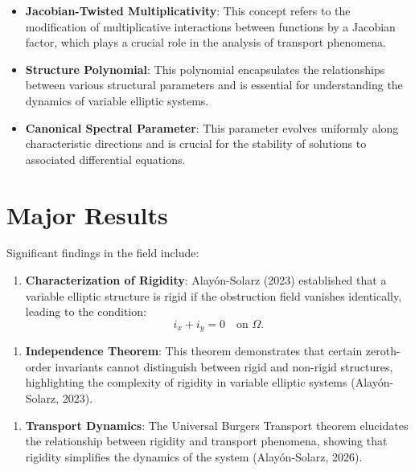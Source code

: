 \documentclass[11pt,a4paper]{article}
\begin{document}
\begin{itemize}
\item \textbf{Jacobian-Twisted Multiplicativity}: This concept refers to the modification of multiplicative interactions between functions by a Jacobian factor, which plays a crucial role in the analysis of transport phenomena.
\end{itemize}

\begin{itemize}
\item \textbf{Structure Polynomial}: This polynomial encapsulates the relationships between various structural parameters and is essential for understanding the dynamics of variable elliptic systems.
\end{itemize}

\begin{itemize}
\item \textbf{Canonical Spectral Parameter}: This parameter evolves uniformly along characteristic directions and is crucial for the stability of solutions to associated differential equations.
\end{itemize}

\section{Major Results}

Significant findings in the field include:

\begin{enumerate}
\item \textbf{Characterization of Rigidity}: Alayón-Solarz (2023) established that a variable elliptic structure is rigid if the obstruction field vanishes identically, leading to the condition:
\[
i_x + i_y = 0 \quad \text{on } \Omega.
\]
\end{enumerate}

\begin{enumerate}
\item \textbf{Independence Theorem}: This theorem demonstrates that certain zeroth-order invariants cannot distinguish between rigid and non-rigid structures, highlighting the complexity of rigidity in variable elliptic systems (Alayón-Solarz, 2023).
\end{enumerate}

\begin{enumerate}
\item \textbf{Transport Dynamics}: The Universal Burgers Transport theorem elucidates the relationship between rigidity and transport phenomena, showing that rigidity simplifies the dynamics of the system (Alayón-Solarz, 2026).
\end{enumerate}
\end{document}
